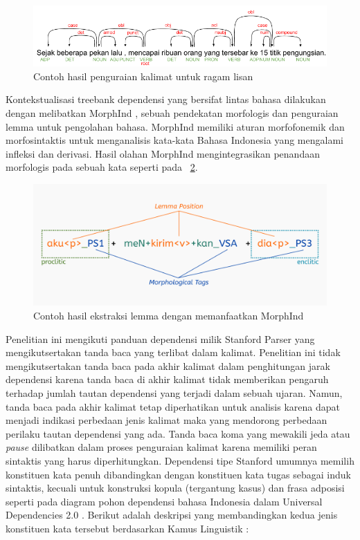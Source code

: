 \begin{figure}
	\centering \includegraphics[width=0.85
	\textwidth] {pics/contohlisan.png} \caption{Contoh hasil penguraian kalimat untuk ragam lisan} 
\label{fig:contohlisan} \end{figure}

Kontekstualisasi treebank dependensi yang bersifat lintas bahasa dilakukan dengan melibatkan MorphInd \citep{larasati2011indonesian}, sebuah pendekatan morfologis dan penguraian lemma untuk pengolahan bahasa. MorphInd memiliki aturan morfofonemik dan morfosintaktis untuk menganalisis kata-kata Bahasa Indonesia yang mengalami infleksi dan derivasi. Hasil olahan MorphInd mengintegrasikan penandaan morfologis pada sebuah kata seperti pada \pic~\ref{fig:morphind_schema}.

\begin{figure}
	\centering \includegraphics[width=1
	\textwidth] {pics/morphind_schema.png} \caption{Contoh hasil ekstraksi lemma dengan memanfaatkan MorphInd \citep{larasati2011indonesian} } 
\label{fig:morphind_schema} 
\end{figure}

Penelitian ini mengikuti panduan dependensi milik Stanford Parser \citep{de2008stanford} yang mengikutsertakan tanda baca yang terlibat dalam kalimat. Penelitian ini tidak mengikutsertakan tanda baca pada akhir kalimat dalam penghitungan jarak dependensi karena tanda baca di akhir kalimat tidak memberikan pengaruh terhadap jumlah tautan dependensi yang terjadi dalam sebuah ujaran. Namun, tanda baca pada akhir kalimat tetap diperhatikan untuk analisis karena dapat menjadi indikasi perbedaan jenis kalimat maka yang mendorong perbedaan perilaku tautan dependensi yang ada. Tanda baca koma yang mewakili jeda atau \textit{pause} dilibatkan dalam proses penguraian kalimat karena memiliki peran sintaktis yang harus diperhitungkan. Dependensi tipe Stanford \citep{de2008stanford} umumnya memilih konstituen kata penuh dibandingkan dengan konstituen kata tugas sebagai induk sintaktis, kecuali untuk konstruksi kopula (tergantung kasus) dan frasa adposisi seperti pada diagram pohon dependensi bahasa Indonesia dalam Universal Dependencies 2.0 \citep{nivre2017universal}. Berikut adalah deskripsi yang membandingkan kedua jenis konstituen kata tersebut berdasarkan Kamus Linguistik \citep{kridalaksana2008kamus}:

